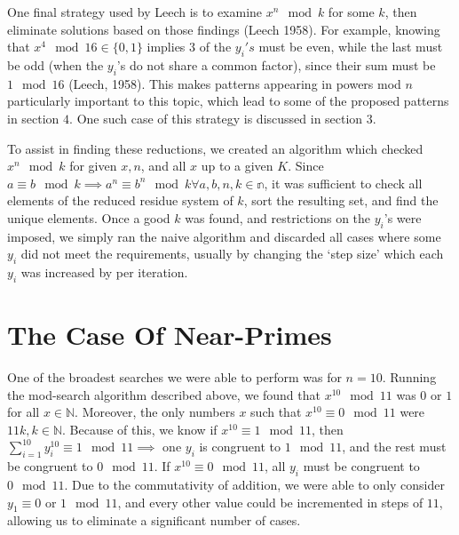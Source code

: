 \documentclass{article}
\begin{document}
\begin{flushleft}
\vspace{.1in}

One final strategy used by Leech is to examine $x^n \mod k$ for some $k$, then eliminate solutions based on those findings (Leech 1958). For example, knowing that $x^4 \mod 16 \in \{0, 1\}$ implies $3$ of the $y_i's$ must be even, while the last must be odd (when the $y_i$'s do not share a common factor), since their sum must be $1 \mod 16$ (Leech, 1958). This makes patterns appearing in powers mod $n$ particularly important to this topic, which lead to some of the proposed patterns in section $4$. One such case of this strategy is discussed in section $3$.

\vspace{.1in}

To assist in finding these reductions, we created an algorithm which checked $x^n \mod k$ for given $x, n$, and all $x$ up to a given $K$. Since $a \equiv b \mod k \implies a^n \equiv b^n \mod k \forall a, b, n, k \in \mathbb{n}$, it was sufficient to check all elements of the reduced residue system of $k$, sort the resulting set, and find the unique elements. Once a good $k$ was found, and restrictions on the $y_i$'s were imposed, we simply ran the naive algorithm and discarded all cases where some $y_i$ did not meet the requirements, usually by changing the `step size' which each $y_i$ was increased by per iteration.

\section{The Case Of Near-Primes}

One of the broadest searches we were able to perform was for $n = 10$. Running the mod-search algorithm described above, we found that $x^{10} \mod 11$ was $0$ or $1$ for all $x \in \mathbb{N}$. Moreover, the only numbers $x$ such that $x^{10} \equiv 0 \mod 11$ were $11k, k \in \mathbb{N}$. Because of this, we know if $x^{10} \equiv 1 \mod 11$, then $\sum^{10}_{i=1}y_i^{10} \equiv 1 \mod 11 \implies$ one $y_i$ is congruent to $1 \mod 11$, and the rest must be congruent to $0 \mod 11$. If $x^10 \equiv 0 \mod 11$, all $y_i$ must be congruent to $0 \mod 11$. Due to the commutativity of addition, we were able to only consider $y_1 \equiv 0$ or $1 \mod 11$, and every other value could be incremented in steps of $11$, allowing us to eliminate a significant number of cases.

\vspace{.1in}


\end{flushleft}
\end{document}

